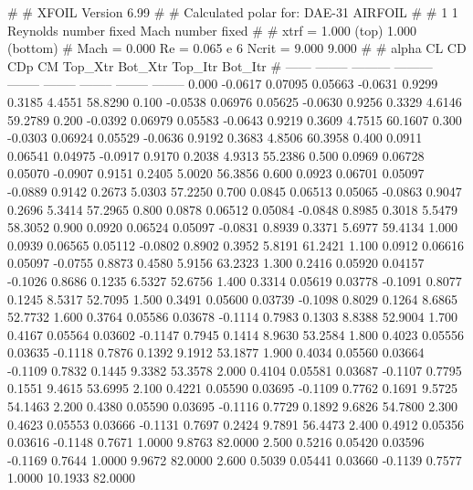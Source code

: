#  
#       XFOIL         Version 6.99
#  
# Calculated polar for: DAE-31 AIRFOIL                                  
#  
# 1 1 Reynolds number fixed          Mach number fixed         
#  
# xtrf =   1.000 (top)        1.000 (bottom)  
# Mach =   0.000     Re =     0.065 e 6     Ncrit =   9.000  9.000
#  
#   alpha    CL        CD       CDp       CM     Top_Xtr  Bot_Xtr  Top_Itr  Bot_Itr
#  ------ -------- --------- --------- -------- -------- -------- -------- --------
   0.000  -0.0617   0.07095   0.05663  -0.0631   0.9299   0.3185   4.4551  58.8290
   0.100  -0.0538   0.06976   0.05625  -0.0630   0.9256   0.3329   4.6146  59.2789
   0.200  -0.0392   0.06979   0.05583  -0.0643   0.9219   0.3609   4.7515  60.1607
   0.300  -0.0303   0.06924   0.05529  -0.0636   0.9192   0.3683   4.8506  60.3958
   0.400   0.0911   0.06541   0.04975  -0.0917   0.9170   0.2038   4.9313  55.2386
   0.500   0.0969   0.06728   0.05070  -0.0907   0.9151   0.2405   5.0020  56.3856
   0.600   0.0923   0.06701   0.05097  -0.0889   0.9142   0.2673   5.0303  57.2250
   0.700   0.0845   0.06513   0.05065  -0.0863   0.9047   0.2696   5.3414  57.2965
   0.800   0.0878   0.06512   0.05084  -0.0848   0.8985   0.3018   5.5479  58.3052
   0.900   0.0920   0.06524   0.05097  -0.0831   0.8939   0.3371   5.6977  59.4134
   1.000   0.0939   0.06565   0.05112  -0.0802   0.8902   0.3952   5.8191  61.2421
   1.100   0.0912   0.06616   0.05097  -0.0755   0.8873   0.4580   5.9156  63.2323
   1.300   0.2416   0.05920   0.04157  -0.1026   0.8686   0.1235   6.5327  52.6756
   1.400   0.3314   0.05619   0.03778  -0.1091   0.8077   0.1245   8.5317  52.7095
   1.500   0.3491   0.05600   0.03739  -0.1098   0.8029   0.1264   8.6865  52.7732
   1.600   0.3764   0.05586   0.03678  -0.1114   0.7983   0.1303   8.8388  52.9004
   1.700   0.4167   0.05564   0.03602  -0.1147   0.7945   0.1414   8.9630  53.2584
   1.800   0.4023   0.05556   0.03635  -0.1118   0.7876   0.1392   9.1912  53.1877
   1.900   0.4034   0.05560   0.03664  -0.1109   0.7832   0.1445   9.3382  53.3578
   2.000   0.4104   0.05581   0.03687  -0.1107   0.7795   0.1551   9.4615  53.6995
   2.100   0.4221   0.05590   0.03695  -0.1109   0.7762   0.1691   9.5725  54.1463
   2.200   0.4380   0.05590   0.03695  -0.1116   0.7729   0.1892   9.6826  54.7800
   2.300   0.4623   0.05553   0.03666  -0.1131   0.7697   0.2424   9.7891  56.4473
   2.400   0.4912   0.05356   0.03616  -0.1148   0.7671   1.0000   9.8763  82.0000
   2.500   0.5216   0.05420   0.03596  -0.1169   0.7644   1.0000   9.9672  82.0000
   2.600   0.5039   0.05441   0.03660  -0.1139   0.7577   1.0000  10.1933  82.0000
